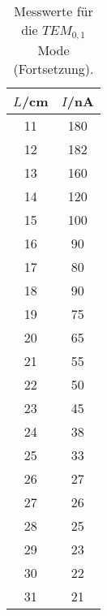 \begin{table}[htp]
	\begin{center}
    \caption{Messwerte für die $TEM_{0,1}$ Mode (Fortsetzung).}
    \label{tab:tem00b}
		\begin{tabular}{cc}
		\toprule
			{$L$/cm} & {$I$/nA}\\
			\midrule
      11 & 180\\
      12 & 182\\
      13 & 160\\
      14 & 120\\
      15 & 100\\
      16 & 90\\
      17 & 80\\
      18 & 90\\
      19 & 75\\
      20 & 65\\
      21 & 55\\
      22 & 50\\
      23 & 45\\
      24 & 38\\
      25 & 33\\
      26 & 27\\
      27 & 26\\
      28 & 25\\
      29 & 23\\
      30 & 22\\
      31 & 21\\
      \bottomrule
  	\end{tabular}
  \end{center}
\end{table}

